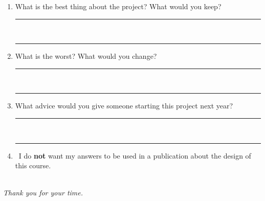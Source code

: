 
\begin{enumerate}[leftmargin=*,resume]

\item What is the best thing about the project? What would you keep?\\[8pt]
\rule{\linewidth}{0.4pt}\\[10pt]
\rule{\linewidth}{0.4pt}

\item What is the worst? What would you change?\\[8pt]
\rule{\linewidth}{0.4pt}\\[10pt]
\rule{\linewidth}{0.4pt}

\item What advice would you give someone starting this project next year?\\[8pt]
\rule{\linewidth}{0.4pt}\\[10pt]
\rule{\linewidth}{0.4pt}

\item \cb\ I do \textbf{not} want my answers to be used in a publication
about the design of this course.

\end{enumerate}

\bigskip
\begin{center}
\noindent\hrulefill\\
\textit{Thank you for your time.}
\end{center}


